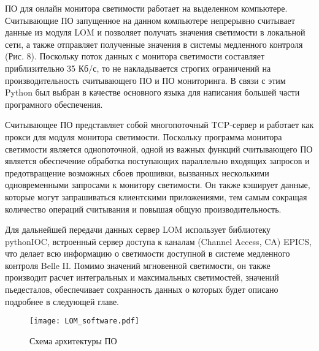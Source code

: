   ПО для онлайн монитора светимости работает на выделенном компьютере. Считывающие ПО запущенное на данном компьютере непрерывно считывает данные из модуля LOM и позволяет получать значения светимости в локальной сети, а также отправляет полученные значения в системы медленного контроля (Рис. 8). Поскольку поток данных с монитора светимости составляет приблизительно 35 Кб/с, то не накладывается строгих ограничений на производительность считывающего ПО и ПО мониторинга. В связи с этим Python был выбран в качестве основного языка для написания большей части програмного обеспечения.\par
  Считывающее ПО представляет собой многопоточный TCP-сервер и работает как прокси для модуля монитора светимости. Поскольку программа монитора светимости является однопоточной, одной из важных функций считывающего ПО является обеспечение обработка поступающих параллельно входящих запросов и предотвращение возможных сбоев прошивки, вызванных несколькими одновременными запросами к монитору светимости. Он также кэширует данные, которые могут запрашиваться клиентскими приложениями, тем самым сокращая количество операций считывания и повышая общую производительность.\par
  Для дальнейшей передачи данных сервер LOM использует библиотеку pythonIOC, встроенный сервер доступа к каналам (Channel Access, CA) EPICS, что делает всю информацию о светимости доступной в системе медленного контроля Belle II. Помимо значений мгновенной светимости, он также производит расчет интегральных и максимальных светимостей, значений пьедесталов, обеспечивает сохранность данных о которых будет описано подробнее в следующей главе.
\begin{figure}[htp]
  \centering
  \texttt{[image: LOM\_software.pdf]}
  \caption{Схема архитектуры ПО}
  \label{fig:galaxy}
\end{figure}
